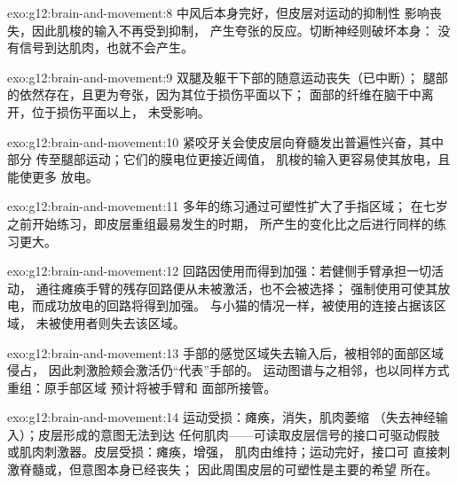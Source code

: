 \begin{solution}{exo:g12:brain-and-movement:8}
中风后本身完好，但皮层对运动的抑制性
影响丧失，因此肌梭的输入不再受到抑制，
产生夸张的反应。切断神经则破坏本身：
没有信号到达肌肉，也就不会产生。
\end{solution}

\begin{solution}{exo:g12:brain-and-movement:9}
双腿及躯干下部的随意运动丧失（已中断）；
腿部的依然存在，且更为夸张，因为其位于损伤平面以下；
面部的纤维在脑干中离开，位于损伤平面以上，
未受影响。
\end{solution}

\begin{solution}{exo:g12:brain-and-movement:10}
紧咬牙关会使皮层向脊髓发出普遍性兴奋，其中部分
传至腿部运动；它们的膜电位更接近阈值，
肌梭的输入更容易使其放电，且能使更多
放电。
\end{solution}

\begin{solution}{exo:g12:brain-and-movement:11}
多年的练习通过可塑性扩大了手指区域；
在七岁之前开始练习，即皮层重组最易发生的时期，
所产生的变化比之后进行同样的练习更大。
\end{solution}

\begin{solution}{exo:g12:brain-and-movement:12}
回路因使用而得到加强：若健侧手臂承担一切活动，
通往瘫痪手臂的残存回路便从未被激活，也不会被选择；
强制使用可使其放电，而成功放电的回路将得到加强。
与小猫的情况一样，被使用的连接占据该区域，
未被使用者则失去该区域。
\end{solution}

\begin{solution}{exo:g12:brain-and-movement:13}
手部的感觉区域失去输入后，被相邻的面部区域侵占，
因此刺激脸颊会激活仍“代表”手部的。
运动图谱与之相邻，也以同样方式重组：原手部区域
预计将被手臂和
面部所接管。
\end{solution}

\begin{solution}{exo:g12:brain-and-movement:14}
运动受损：瘫痪，消失，肌肉萎缩
（失去神经输入）；皮层形成的意图无法到达
任何肌肉——可读取皮层信号的接口可驱动假肢
或肌肉刺激器。皮层受损：瘫痪，增强，
肌肉由维持；运动完好，接口可
直接刺激脊髓或，但意图本身已经丧失；
因此周围皮层的可塑性是主要的希望
所在。
\end{solution}

